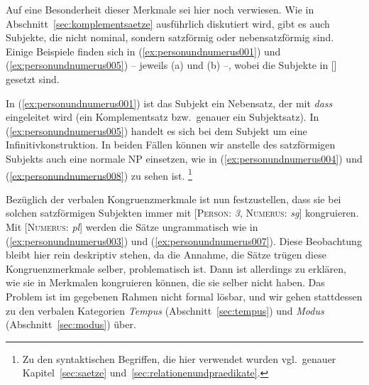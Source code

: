 Auf eine Besonderheit dieser Merkmale sei hier noch verwiesen.
Wie in Abschnitt~\ref{sec:komplementsaetze} ausführlich diskutiert wird, gibt es auch Subjekte, die nicht nominal, sondern satzförmig oder nebensatzförmig sind.
Einige Beispiele finden sich in (\ref{ex:personundnumerus001}) und (\ref{ex:personundnumerus005}) -- jeweils (a) und (b) --, wobei die Subjekte in [] gesetzt sind.

\Enl

\begin{exe}
  \ex\label{ex:personundnumerus001}
  \begin{xlist}
  \end{xlist}
  \ex\label{ex:personundnumerus005}
  \begin{xlist}
  \end{xlist}
\end{exe}

In (\ref{ex:personundnumerus001}) ist das Subjekt ein Nebensatz, der mit \textit{dass} eingeleitet wird (ein Komplementsatz bzw.\ genauer ein Subjektsatz).
In (\ref{ex:personundnumerus005}) handelt es sich bei dem Subjekt um eine Infinitivkonstruktion.
In beiden Fällen können wir anstelle des satzförmigen Subjekts auch eine normale NP einsetzen, wie in (\ref{ex:personundnumerus004}) und (\ref{ex:personundnumerus008}) zu sehen ist.%
\footnote{Zu den syntaktischen Begriffen, die hier verwendet wurden vgl.\ genauer Kapitel~\ref{sec:saetze} und~\ref{sec:relationenundpraedikate}.}

Bezüglich der verbalen Kongruenzmerkmale ist nun festzustellen, dass sie bei solchen satzförmigen Subjekten immer mit [\textsc{Person}: \textit{3}, \textsc{Numerus}: \textit{sg}] kongruieren.
Mit [\textsc{Numerus}: \textit{pl}] werden die Sätze ungrammatisch wie in (\ref{ex:personundnumerus003}) und (\ref{ex:personundnumerus007}).
Diese Beobachtung bleibt hier rein deskriptiv stehen, da die Annahme, die Sätze trügen diese Kongruenzmerkmale selber, problematisch ist.
Dann ist allerdings zu erklären, wie sie in Merkmalen kongruieren können, die sie selber nicht haben.
Das Problem ist im gegebenen Rahmen nicht formal lösbar, und wir gehen stattdessen zu den verbalen Kategorien \textit{Tempus} (Abschnitt~\ref{sec:tempus}) und \textit{Modus} (Abschnitt~\ref{sec:modus}) über.

